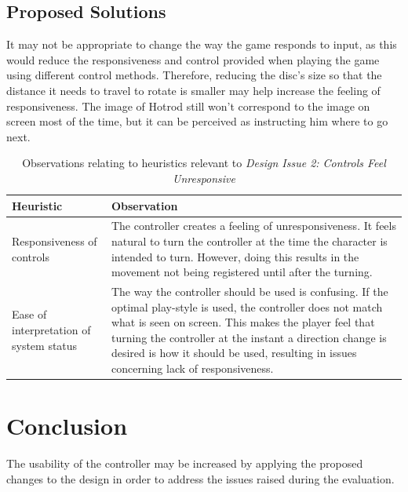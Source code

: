 \documentclass{scrartcl}
\begin{document}
\subsection{Proposed Solutions}
It may not be appropriate to change the way the game responds to input, as this would reduce the responsiveness and control provided when playing the game using different control methods. Therefore, reducing the disc's size so that the distance it needs to travel to rotate is smaller may help increase the feeling of responsiveness. The image of Hotrod still won't correspond to the image on screen most of the time, but it can be perceived as instructing him where to go next.

\begin{table}[h]
\centering
\begin{tabular}{| l | p{6cm} |}
\hline
\textbf{Heuristic} & \textbf{Observation} \\ \hline
Responsiveness of controls
 & The controller creates a feeling of unresponsiveness. It feels natural to turn the controller at the time the character is intended to turn. However, doing this results in the movement not being registered until after the turning. \\ \hline
Ease of interpretation of system status
 & The way the controller should be used is confusing. If the optimal play-style is used, the controller does not match what is seen on screen. This makes the player feel that turning the controller at the instant a direction change is desired is how it should be used, resulting in issues concerning lack of responsiveness. \\ \hline
\end{tabular}
\caption{Observations relating to heuristics relevant to \textit{Design Issue 2: Controls Feel Unresponsive}}
\label{table:issue2}
\end{table}

\section{Conclusion}
The usability of the controller may be increased by applying the proposed changes to the design in order to address the issues raised during the evaluation.



\end{document}
